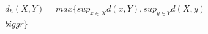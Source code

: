\documentclass[preview]{standalone}
\begin{document}
\begin{align*}
d_h(X,Y) = max \biggl\{sup_{x \in X} d(x,Y), sup_{y \in Y} d(X,y) \\biggr\}
\end{align*}
\end{document}
